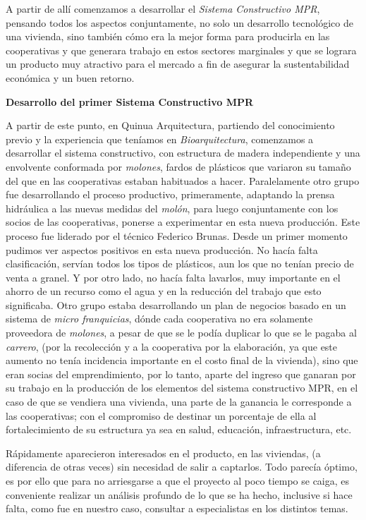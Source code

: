 \begin{fullwidth}
A partir de allí comenzamos a desarrollar el \emph{Sistema Constructivo
MPR}, pensando todos los aspectos conjuntamente, no solo un desarrollo
tecnológico de una vivienda, sino también cómo era la mejor forma para
producirla en las cooperativas y que generara trabajo en estos sectores
marginales y que se lograra un producto muy atractivo para el mercado a
fin de asegurar la sustentabilidad económica y un buen retorno.

\textbf{Desarrollo del primer Sistema Constructivo MPR}

A partir de este punto, en Quinua Arquitectura, partiendo del
conocimiento previo y la experiencia que teníamos en
\emph{Bioarquitectura}, comenzamos a desarrollar el sistema
constructivo, con estructura de madera independiente y una envolvente
conformada por \emph{molones}, fardos de plásticos que variaron su
tamaño del que en las cooperativas estaban habituados a hacer.
Paralelamente otro grupo fue desarrollando el proceso productivo,
primeramente, adaptando la prensa hidráulica a las nuevas medidas del
\emph{molón}, para luego conjuntamente con los socios de las
cooperativas, ponerse a experimentar en esta nueva producción. Este
proceso fue liderado por el técnico Federico Brunas. Desde un primer
momento pudimos ver aspectos positivos en esta nueva producción. No
hacía falta clasificación, servían todos los tipos de plásticos, aun los
que no tenían precio de venta a granel. Y por otro lado, no hacía falta
lavarlos, muy importante en el ahorro de un recurso como el agua y en la
reducción del trabajo que esto significaba. Otro grupo estaba
desarrollando un plan de negocios basado en un sistema de \emph{micro
franquicias}, dónde cada cooperativa no era solamente proveedora de
\emph{molones}, a pesar de que se le podía duplicar lo que se le pagaba
al \emph{carrero}, (por la recolección y a la cooperativa por la
elaboración, ya que este aumento no tenía incidencia importante en el
costo final de la vivienda), sino que eran socias del emprendimiento,
por lo tanto, aparte del ingreso que ganaran por su trabajo en la
producción de los elementos del sistema constructivo MPR, en el caso de
que se vendiera una vivienda, una parte de la ganancia le corresponde a
las cooperativas; con el compromiso de destinar un porcentaje de ella al
fortalecimiento de su estructura ya sea en salud, educación,
infraestructura, etc.

Rápidamente aparecieron interesados en el producto, en las viviendas, (a
diferencia de otras veces) sin necesidad de salir a captarlos. Todo
parecía óptimo, es por ello que para no arriesgarse a que el proyecto al
poco tiempo se caiga, es conveniente realizar un análisis profundo de lo
que se ha hecho, inclusive si hace falta, como fue en nuestro caso,
consultar a especialistas en los distintos temas.


\end{fullwidth}
